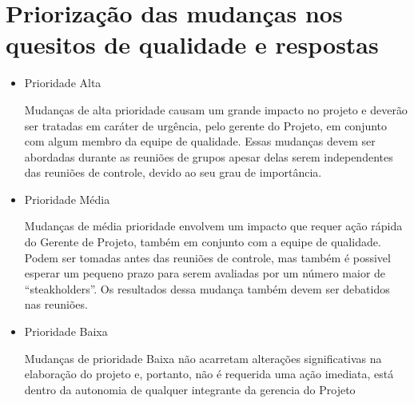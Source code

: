 \documentclass[12pt,openright,oneside,a4paper,brazil]{abntex2}
\begin{document}
 \section{Priorização das mudanças nos quesitos de qualidade e respostas}
 \begin{itemize}
 \item Prioridade Alta
 
 Mudanças de alta prioridade causam um grande impacto no projeto e deverão ser tratadas em caráter de urgência, pelo gerente do Projeto, em conjunto com algum membro da equipe de qualidade. Essas mudanças devem ser abordadas durante as  reuniões de grupos apesar delas serem independentes das reuniões de controle, devido ao seu grau de importância. 
 
 \item Prioridade Média
 
 Mudanças de média prioridade envolvem um impacto que requer ação rápida do Gerente de Projeto, também em conjunto com a equipe de qualidade. Podem ser tomadas antes das reuniões de controle, mas também é possivel esperar um pequeno prazo para serem avaliadas por um número maior de “steakholders”. Os resultados dessa mudança também devem ser debatidos nas reuniões.

\item Prioridade Baixa

	Mudanças de prioridade Baixa não acarretam alterações significativas na elaboração do projeto e, portanto, não é requerida uma ação imediata, está dentro da autonomia de qualquer integrante da gerencia do Projeto
 \end{itemize}
 
\end{document}
